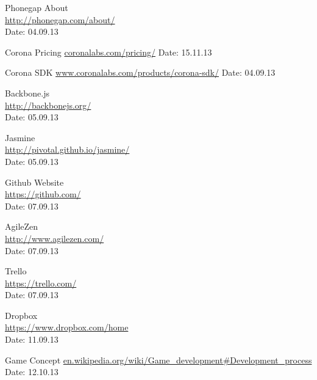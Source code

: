\begin{thebibliography}{99}
	Phonegap About \\
	\href{http://phonegap.com/about/}{http://phonegap.com/about/} \\
	Date: 04.09.13

	Corona Pricing\newline
	\href {http://coronalabs.com/pricing/}{coronalabs.com/pricing/}\newline
	Date: 15.11.13

	Corona SDK\newline
	\href {http://www.coronalabs.com/products/corona-sdk/}{www.coronalabs.com/products/corona-sdk/}\newline
	Date: 04.09.13

	Backbone.js \\
	\href{http://backbonejs.org/}{http://backbonejs.org/} \\
	Date: 05.09.13

	Jasmine \\ 
	\href{http://pivotal.github.io/jasmine/}{http://pivotal.github.io/jasmine/} \\
	Date: 05.09.13

	Github Website\\
	\href{https://github.com/}{https://github.com/} \\
	Date: 07.09.13

	AgileZen \\
	\href{http://www.agilezen.com/}{http://www.agilezen.com/} \\
	Date: 07.09.13

	Trello \\
	\href{https://trello.com/}{https://trello.com/} \\
	Date: 07.09.13

	Dropbox \\
	\href{https://www.dropbox.com/home}{https://www.dropbox.com/home} \\
	Date: 11.09.13


	Game Concept\newline
	\href {en.wikipedia.org/wiki/Game_development#Development_process}{en.wikipedia.org/wiki/Game\_development\#Development\_process}\newline
	Date: 12.10.13



\end{thebibliography}
